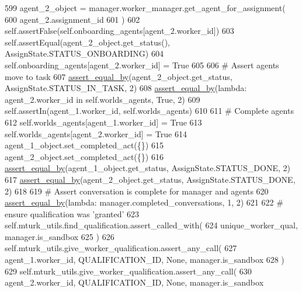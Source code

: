 \begin{DoxyCode}
599         agent\_2\_object = manager.worker\_manager.get\_agent\_for\_assignment(
600             agent\_2.assignment\_id
601         )
602         self.assertFalse(self.onboarding\_agents[agent\_2.worker\_id])
603         self.assertEqual(agent\_2\_object.get\_status(), AssignState.STATUS\_ONBOARDING)
604         self.onboarding\_agents[agent\_2.worker\_id] = \textcolor{keyword}{True}
605 
606         \textcolor{comment}{# Assert agents move to task}
607         \hyperlink{namespaceparlai_1_1mturk_1_1core_1_1test_1_1test__full__system_a0b463246d35658a2e422010f13dcf819}{assert\_equal\_by}(agent\_2\_object.get\_status, AssignState.STATUS\_IN\_TASK, 2)
608         \hyperlink{namespaceparlai_1_1mturk_1_1core_1_1test_1_1test__full__system_a0b463246d35658a2e422010f13dcf819}{assert\_equal\_by}(\textcolor{keyword}{lambda}: agent\_2.worker\_id \textcolor{keywordflow}{in} self.worlds\_agents, \textcolor{keyword}{True}, 2)
609         self.assertIn(agent\_1.worker\_id, self.worlds\_agents)
610 
611         \textcolor{comment}{# Complete agents}
612         self.worlds\_agents[agent\_1.worker\_id] = \textcolor{keyword}{True}
613         self.worlds\_agents[agent\_2.worker\_id] = \textcolor{keyword}{True}
614         agent\_1\_object.set\_completed\_act(\{\})
615         agent\_2\_object.set\_completed\_act(\{\})
616         \hyperlink{namespaceparlai_1_1mturk_1_1core_1_1test_1_1test__full__system_a0b463246d35658a2e422010f13dcf819}{assert\_equal\_by}(agent\_1\_object.get\_status, AssignState.STATUS\_DONE, 2)
617         \hyperlink{namespaceparlai_1_1mturk_1_1core_1_1test_1_1test__full__system_a0b463246d35658a2e422010f13dcf819}{assert\_equal\_by}(agent\_2\_object.get\_status, AssignState.STATUS\_DONE, 2)
618 
619         \textcolor{comment}{# Assert conversation is complete for manager and agents}
620         \hyperlink{namespaceparlai_1_1mturk_1_1core_1_1test_1_1test__full__system_a0b463246d35658a2e422010f13dcf819}{assert\_equal\_by}(\textcolor{keyword}{lambda}: manager.completed\_conversations, 1, 2)
621 
622         \textcolor{comment}{# ensure qualification was 'granted'}
623         self.mturk\_utils.find\_qualification.assert\_called\_with(
624             unique\_worker\_qual, manager.is\_sandbox
625         )
626         self.mturk\_utils.give\_worker\_qualification.assert\_any\_call(
627             agent\_1.worker\_id, QUALIFICATION\_ID, \textcolor{keywordtype}{None}, manager.is\_sandbox
628         )
629         self.mturk\_utils.give\_worker\_qualification.assert\_any\_call(
630             agent\_2.worker\_id, QUALIFICATION\_ID, \textcolor{keywordtype}{None}, manager.is\_sandbox

\end{DoxyCode}
